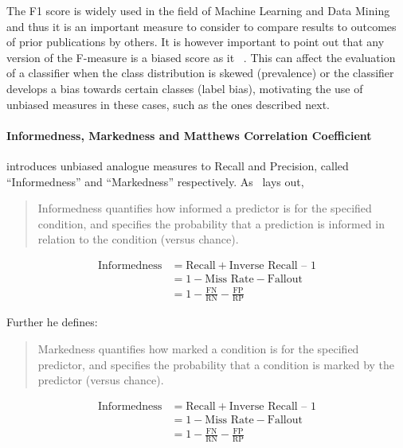 The F1 score is widely used in the field of Machine Learning and Data Mining and thus it is an important measure to consider to compare results to outcomes of prior publications by others.
It is however important to point out that any version of the F-measure is a biased score as it ~\cite{Powers:2011aa}. This can affect the evaluation of a classifier when the class distribution is skewed (prevalence) or the classifier develops a bias towards certain classes (label bias), motivating the use of unbiased measures in these cases, such as the ones described next.

\paragraph{Informedness, Markedness and Matthews Correlation Coefficient}
\label{par:Informedness, Markedness and Matthews Correlation Coefficient}

\cite{Powers:2011aa} introduces unbiased analogue measures to Recall and Precision, called ``Informedness'' and ``Markedness'' respectively. As~\cite{Powers:2011aa} lays out, \blockquote{Informedness quantifies how informed a predictor is for the specified condition, and specifies the probability that a prediction is informed in relation to the condition (versus chance).}:

\begin{equation}
  \begin{split}
  \text{Informedness} &= \text{Recall} + \text{Inverse Recall} \text{ – } 1 \\
  &= 1 - \text{Miss Rate} - \text{Fallout} \\
  &= 1 - \frac{\text{FN}}{ \text{RN}} - \frac{\text{FP}}{\text{RP}}
  \end{split}
\end{equation}

Further he defines:
\blockquote{Markedness quantifies how marked a condition is for the specified predictor, and specifies the probability that a condition is marked by the predictor (versus chance).}

\begin{equation}
  \begin{split}
  \text{Informedness} &= \text{Recall} + \text{Inverse Recall} \text{ – } 1 \\
  &= 1 - \text{Miss Rate} - \text{Fallout} \\
  &= 1 - \frac{\text{FN}}{ \text{RN}} - \frac{\text{FP}}{\text{RP}}
  \end{split}
\end{equation}

